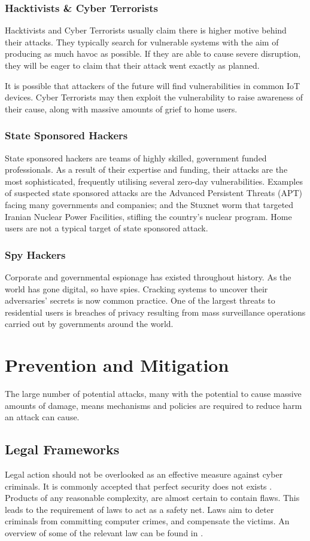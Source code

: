 \documentclass[10pt,journal,compsoc]{IEEEtran}
\begin{document}
\subsubsection{Hacktivists \& Cyber Terrorists}
Hacktivists and Cyber Terrorists usually claim there is higher motive behind
their attacks. They typically search for vulnerable systems with the aim of
producing as much havoc as possible. If they are able to cause severe
disruption, they will be eager to claim that their attack went exactly as
planned. 

It is possible that attackers of the future will find vulnerabilities in common
IoT devices. Cyber Terrorists may then exploit the vulnerability to raise
awareness of their cause, along with massive amounts of grief to home users. 

\subsubsection{State Sponsored Hackers}
State sponsored hackers are teams of highly skilled, government funded
professionals. As a result of their expertise and funding, their attacks are
the most sophisticated, frequently utilising several zero-day vulnerabilities.
Examples of suspected state sponsored attacks are the Advanced Persistent
Threats (APT) facing many governments and companies; and the Stuxnet worm
that targeted Iranian Nuclear Power Facilities, stifling the country's nuclear
program. Home users are not a typical target of state sponsored attack. 

\subsubsection{Spy Hackers}
Corporate and governmental espionage has existed throughout history. As the
world has gone digital, so have spies. Cracking systems to uncover their
adversaries' secrets is now common practice. One of the largest threats to
residential users is breaches of privacy resulting from mass surveillance
operations carried out by governments around the world.  


\section{Prevention and Mitigation}
The large number of potential attacks, many with the potential to cause massive
amounts of damage, means mechanisms and policies are required to reduce harm an
attack can cause. 

\subsection{Legal Frameworks}
Legal action should not be overlooked as an effective measure against cyber
criminals. It is commonly accepted that perfect security does not exists
\cite{ThereMustBeA}. Products of any reasonable complexity, are almost certain
to contain flaws. This leads to the requirement of laws to act as a safety net.
Laws aim to deter criminals from committing computer crimes, and compensate the
victims. An overview of some of the relevant law can be found in
\cite{Weber2010}. 
\end{document}
